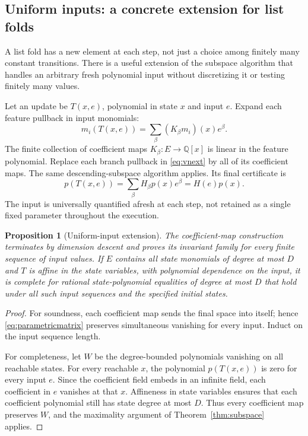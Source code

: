 \documentclass[11pt,letterpaper]{article}
\newcommand{\Q}{\mathbb Q}\newcommand{\R}{\mathbb R}\newcommand{\N}{\mathbb N}
\newtheorem{proposition}[theorem]{Proposition}
\theoremstyle{definition}\newtheorem{definition}[theorem]{Definition}
\theoremstyle{remark}\newtheorem{remark}[theorem]{Remark}
\begin{document}
\subsection{Uniform inputs: a concrete extension for list folds}
\label{sec:uniform}
A list fold has a new element at each step, not just a choice among finitely
many constant transitions. There is a useful extension of the subspace
algorithm that handles an arbitrary fresh polynomial input without discretizing
it or testing finitely many values.

Let an update be $T(x,e)$, polynomial in state $x$ and input $e$. Expand each
feature pullback in input monomials:
\begin{equation}
 m_i(T(x,e))=\sum_{\beta} (K_\beta m_i)(x)e^\beta.
 \label{eq:inputcoeff}
\end{equation}
The finite collection of coefficient maps $K_\beta:E\to\Q[x]$ is linear in
the feature polynomial. Replace each branch pullback in
\eqref{eq:vnext} by all of its coefficient maps. The same descending-subspace
algorithm applies. Its final certificate is
\begin{equation}
 p(T(x,e))=\sum_\beta H_\beta p(x)e^\beta
          =H(e)p(x).
 \label{eq:parametricmatrix}
\end{equation}
The input is universally quantified afresh at each step, not retained as a
single fixed parameter throughout the execution.

\begin{proposition}[Uniform-input extension]
The coefficient-map construction terminates by dimension descent and proves
its invariant family for every finite sequence of input values. If $E$ contains
all state monomials of degree at most $D$ and $T$ is affine in the state
variables, with polynomial dependence on the input, it is complete for
rational state-polynomial equalities of degree at most $D$ that hold under all
such input sequences and the specified initial states.
\end{proposition}
\begin{proof}
For soundness, each coefficient map sends the final space into itself; hence
\eqref{eq:parametricmatrix} preserves simultaneous vanishing for every input.
Induct on the input sequence length.

For completeness, let $W$ be the degree-bounded polynomials vanishing on all
reachable states. For every reachable $x$, the polynomial
$p(T(x,e))$ is zero for every input $e$. Since the coefficient field embeds in
an infinite field, each coefficient in $e$ vanishes at that $x$. Affineness in
state variables ensures that each coefficient polynomial still has state degree
at most $D$. Thus every coefficient map preserves $W$, and the maximality
argument of Theorem~\ref{thm:subspace} applies.
\end{proof}
\end{document}
